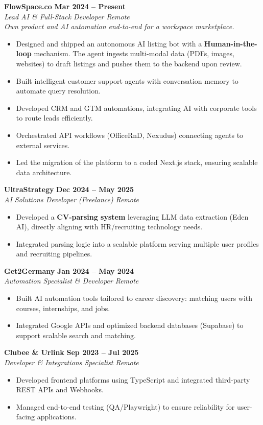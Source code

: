 \documentclass[a4paper,10pt]{article}
\newcommand{\role}[4]{%
 \textbf{#1} \hfill \textbf{#2}\\[1pt]%
 \textit{#3} \hfill \textit{#4}\\[2pt]%
}
\begin{document}
\role{FlowSpace.co}{Mar 2024 -- Present}{Lead AI \& Full-Stack Developer}{Remote}
\textit{Own product and AI automation end-to-end for a workspace marketplace.}
\begin{itemize}
 \item Designed and shipped an autonomous AI listing bot with a \textbf{Human-in-the-loop} mechanism. The agent ingests multi-modal data (PDFs, images, websites) to draft listings and pushes them to the backend upon review.
 \item Built intelligent customer support agents with conversation memory to automate query resolution.
 \item Developed CRM and GTM automations, integrating AI with corporate tools to route leads efficiently.
 \item Orchestrated API workflows (OfficeRnD, Nexudus) connecting agents to external services.
 \item Led the migration of the platform to a coded Next.js stack, ensuring scalable data architecture.
\end{itemize}

\role{UltraStrategy}{Dec 2024 -- May 2025}{AI Solutions Developer (Freelance)}{Remote}
\begin{itemize}
 \item Developed a \textbf{CV-parsing system} leveraging LLM data extraction (Eden AI), directly aligning with HR/recruiting technology needs.
 \item Integrated parsing logic into a scalable platform serving multiple user profiles and recruiting pipelines.
\end{itemize}

\role{Get2Germany}{Jan 2024 -- May 2024}{Automation Specialist \& Developer}{Remote}
\begin{itemize}
 \item Built AI automation tools tailored to career discovery: matching users with courses, internships, and jobs.
 \item Integrated Google APIs and optimized backend databases (Supabase) to support scalable search and matching.
\end{itemize}

\role{Clubee \& Urlink}{Sep 2023 -- Jul 2025}{Developer \& Integrations Specialist}{Remote}
\begin{itemize}
 \item Developed frontend platforms using TypeScript and integrated third-party REST APIs and Webhooks.
 \item Managed end-to-end testing (QA/Playwright) to ensure reliability for user-facing applications.
\end{itemize}
\end{document}
